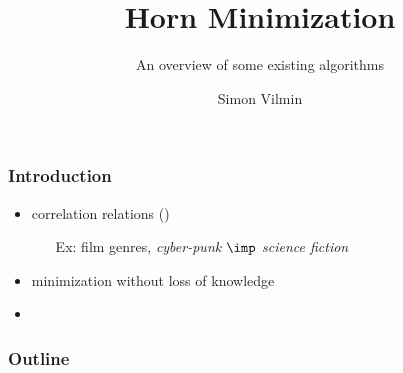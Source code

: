 \documentclass{beamer}
\begin{document}
	
\title{Horn Minimization}
\subtitle{An overview of some existing algorithms}
\author{Simon Vilmin}

{

\begin{frame}
\vspace{0.8em}
\maketitle

\end{frame}


\begin{frame}
\frametitle{Introduction}

\begin{itemize}
	\item correlation relations ()
	\begin{itemize}
		\item[\color{midnight} Ex:] {\color{midnight} film genres, 
			\textit{cyber-punk $\imp$ science fiction}}
	\end{itemize}
	
	\vspace{1.2em}
	
	\item minimization without loss of knowledge
	
	\vspace{1.2em}
	
	\item 
\end{itemize}

\end{frame}



\begin{frame}
\frametitle{Outline}
\tableofcontents

\end{frame}
}
\end{document}
